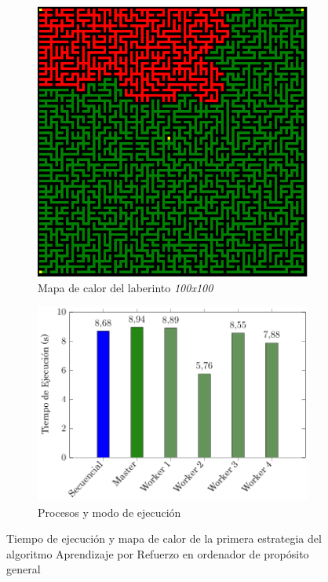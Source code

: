 		\begin{figure}[!h]
			\centering
			\begin{subfigure}[t]{0.4\textwidth}
				\centering
				\includegraphics[width=\textwidth]{images/chapter_4/mapa_calor}
				\caption{Mapa de calor del laberinto \textit{100x100}}
				\label{fig:RL_mapa_calor}
			\end{subfigure}
			\hfill
			\begin{subfigure}[t]{0.5\textwidth}
				\centering
				\includegraphics[width=\textwidth]{images/chapter_4/histo}
				\caption{Procesos y modo de ejecución}
				\label{fig:RL_histo}
			\end{subfigure}
			\caption{Tiempo de ejecución y mapa de calor de la primera estrategia del algoritmo Aprendizaje por Refuerzo en ordenador de propósito general}
			\label{fig:RL_estrategia1}
		\end{figure}
		
